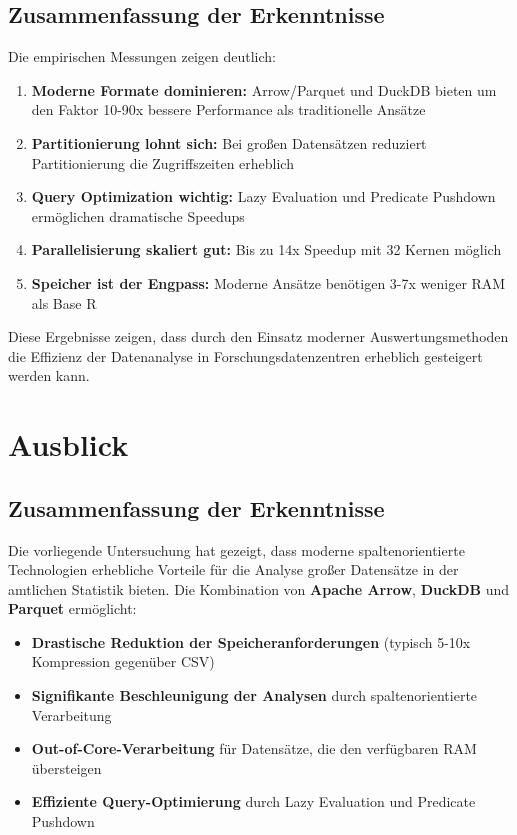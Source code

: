 \documentclass[
  ngerman,
  10pt,
  twocolumn]{article}
\providecommand{\tightlist}{%
  \setlength{\itemsep}{0pt}\setlength{\parskip}{0pt}}
\begin{document}
\subsection{Zusammenfassung der
Erkenntnisse}\label{zusammenfassung-der-erkenntnisse}

Die empirischen Messungen zeigen deutlich:

\begin{enumerate}
\def\labelenumi{\arabic{enumi}.}
\item
  \textbf{Moderne Formate dominieren:} Arrow/Parquet und DuckDB bieten
  um den Faktor 10-90x bessere Performance als traditionelle Ansätze
\item
  \textbf{Partitionierung lohnt sich:} Bei großen Datensätzen reduziert
  Partitionierung die Zugriffszeiten erheblich
\item
  \textbf{Query Optimization wichtig:} Lazy Evaluation und Predicate
  Pushdown ermöglichen dramatische Speedups
\item
  \textbf{Parallelisierung skaliert gut:} Bis zu 14x Speedup mit 32
  Kernen möglich
\item
  \textbf{Speicher ist der Engpass:} Moderne Ansätze benötigen 3-7x
  weniger RAM als Base R
\end{enumerate}

Diese Ergebnisse zeigen, dass durch den Einsatz moderner
Auswertungsmethoden die Effizienz der Datenanalyse in
Forschungsdatenzentren erheblich gesteigert werden kann.

\section{Ausblick}\label{sec-ausblick}

\subsection{Zusammenfassung der
Erkenntnisse}\label{zusammenfassung-der-erkenntnisse-1}

Die vorliegende Untersuchung hat gezeigt, dass moderne
spaltenorientierte Technologien erhebliche Vorteile für die Analyse
großer Datensätze in der amtlichen Statistik bieten. Die Kombination von
\textbf{Apache Arrow}, \textbf{DuckDB} und \textbf{Parquet} ermöglicht:

\begin{itemize}
\tightlist
\item
  \textbf{Drastische Reduktion der Speicheranforderungen} (typisch 5-10x
  Kompression gegenüber CSV)
\item
  \textbf{Signifikante Beschleunigung der Analysen} durch
  spaltenorientierte Verarbeitung
\item
  \textbf{Out-of-Core-Verarbeitung} für Datensätze, die den verfügbaren
  RAM übersteigen
\item
  \textbf{Effiziente Query-Optimierung} durch Lazy Evaluation und
  Predicate Pushdown
\end{itemize}
\end{document}
